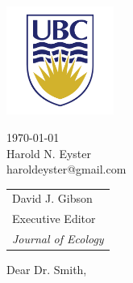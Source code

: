 \documentclass[11pt]{article}
\begin{document}
	\hspace{2.8in}
	\begin{minipage}{2in}
	\includegraphics[width=100pt]{ubc}
	\end{minipage}
\hfill
	\begin{minipage}{3in}
	\today \\[\jot]
	Harold N. Eyster\\
	haroldeyster@gmail.com
	\end{minipage}
	\medskip
	\begin{tabular}{@{}l}
		David J. Gibson \\
		Executive Editor \\
		\textit{Journal of Ecology} \\
	\end{tabular}
	
	\bigskip
	
	Dear Dr. Smith,
	
\end{document}
